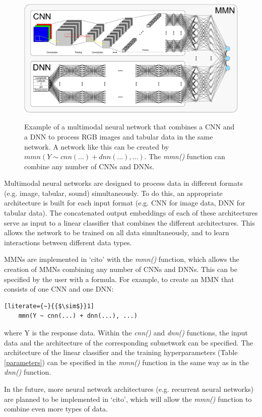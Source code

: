\documentclass[12pt,twoside]{scrreport}
\newcommand{\pkg}[1]{`#1'}
\newcommand{\fn}[2][]{\textit{#2(}#1\textit{)}}
\begin{document}
\begin{figure}
	\includegraphics[width=\textwidth]{MMN.pdf}
	\label{MMN}
	\caption{Example of a multimodal neural network that combines a CNN and a DNN to process RGB images and tabular data in the same network. A network like this can be created by $mmn(Y \sim cnn(...) + dnn(...), ...)$. The \fn{mmn} function can combine any number of CNNs and DNNs.}
\end{figure}

Multimodal neural networks are designed to process data in different formats (e.g. image, tabular, sound) simultaneously. To do this, an appropriate architecture is built for each input format (e.g. CNN for image data, DNN for tabular data). The concatenated output embeddings of each of these architectures serve as input to a linear classifier that combines the different architectures. This allows the network to be trained on all data simultaneously, and to learn interactions between different data types.

MMNs are implemented in \pkg{cito} with the \fn{mmn} function, which allows the creation of MMNs combining any number of CNNs and DNNs. This can be specified by the user with a formula. For example, to create an MMN that consists of one CNN and one DNN:

\begin{lstlisting}[literate={~}{{$\sim$}}1]
	mmn(Y ~ cnn(...) + dnn(...), ...)
\end{lstlisting}

where Y is the response data. Within the \fn{cnn} and \fn{dnn} functions, the input data and the architecture of the corresponding subnetwork can be specified. The architecture of the linear classifier and the training hyperparameters (Table \ref{parameters}) can be specified in the \fn{mmn} function in the same way as in the \fn{dnn} function.

In the future, more neural network architectures (e.g. recurrent neural networks) are planned to be implemented in \pkg{cito}, which will allow the \fn{mmn} function to combine even more types of data. 
\end{document}
